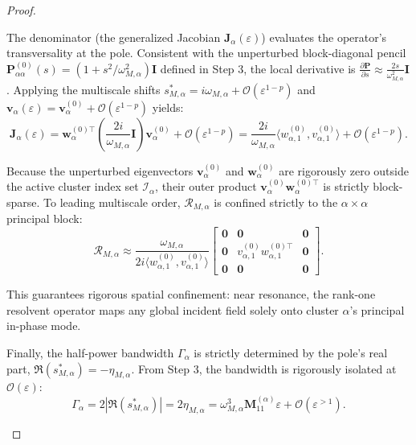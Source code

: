 \documentclass[11pt,a4paper]{article}
\numberwithin{equation}{section}
\begin{document}
\begin{proof}
\begin{enumerate}
The denominator (the generalized Jacobian $\bm{J}_\alpha(\varepsilon)$) evaluates the operator's transversality at the pole. Consistent with the unperturbed block-diagonal pencil $\mathbf{P}_{\alpha\alpha}^{(0)}(s) = (1 + s^2/\omega_{M,\alpha}^2)\mathbf{I}$ defined in Step 3, the local derivative is $\frac{\partial \mathbf{P}}{\partial s} \approx \frac{2s}{\omega_{M,\alpha}^2}\mathbf{I}$. Applying the multiscale shifts $s_{M, \alpha}^\ast = i\omega_{M,\alpha} + \mathcal{O}(\varepsilon^{1-p})$ and $\mathbf{v}_\alpha(\varepsilon) = \mathbf{v}_\alpha^{(0)} + \mathcal{O}(\varepsilon^{1-p})$ yields:
\begin{equation}
    \mathbf{J}_\alpha(\varepsilon) = \mathbf{w}_\alpha^{(0)\top} \left( \frac{2i}{\omega_{M,\alpha}} \mathbf{I} \right) \mathbf{v}_\alpha^{(0)} + \mathcal{O}(\varepsilon^{1-p}) = \frac{2i}{\omega_{M,\alpha}} \langle w_{\alpha, 1}^{(0)}, v_{\alpha, 1}^{(0)} \rangle + \mathcal{O}(\varepsilon^{1-p}).
\end{equation}

Because the unperturbed eigenvectors $\mathbf{v}_\alpha^{(0)}$ and $\mathbf{w}_\alpha^{(0)}$ are rigorously zero outside the active cluster index set $\mathcal{I}_\alpha$, their outer product $\mathbf{v}_\alpha^{(0)} \mathbf{w}_\alpha^{(0)\top}$ is strictly block-sparse. To leading multiscale order, $\mathcal{R}_{M, \alpha}$ is confined strictly to the $\alpha \times \alpha$ principal block:
\begin{equation}
    \mathcal{R}_{M, \alpha} \approx \frac{\omega_{M,\alpha}}{2i \langle w_{\alpha, 1}^{(0)}, v_{\alpha, 1}^{(0)} \rangle} \begin{bmatrix} \mathbf{0} & \mathbf{0} & \mathbf{0} \\ \mathbf{0} & v_{\alpha, 1}^{(0)} w_{\alpha, 1}^{(0)\top} & \mathbf{0} \\ \mathbf{0} & \mathbf{0} & \mathbf{0} \end{bmatrix}.
\end{equation}

This guarantees rigorous spatial confinement: near resonance, the rank-one resolvent operator maps any global incident field solely onto cluster $\alpha$'s principal in-phase mode. 

Finally, the half-power bandwidth $\Gamma_\alpha$ is strictly determined by the pole's real part, $\Re(s_{M, \alpha}^\ast) = -\eta_{M, \alpha}$. From Step 3, the bandwidth is rigorously isolated at $\mathcal{O}(\varepsilon)$:
\begin{equation}
    \Gamma_\alpha = 2|\Re(s_{M, \alpha}^\ast)| = 2\eta_{M, \alpha} = \omega_{M,\alpha}^3 \mathbf{M}_{11}^{(\alpha)} \varepsilon + \mathcal{O}(\varepsilon^{>1}).
\end{equation}



\end{enumerate}
\end{proof}
\end{document}
